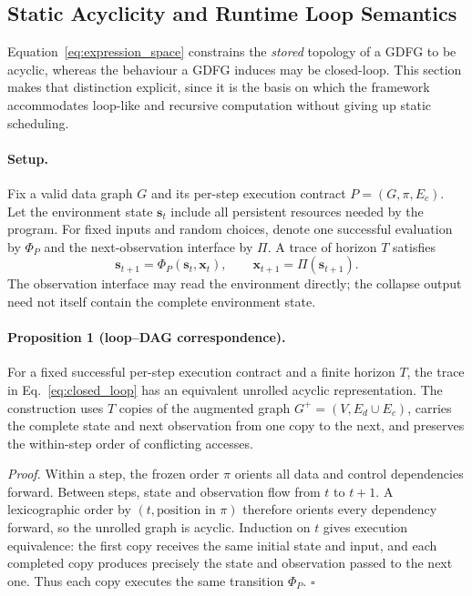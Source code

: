 \subsection{Static Acyclicity and Runtime Loop Semantics}
\label{app:runtime_loops}

Equation~\ref{eq:expression_space} constrains the \emph{stored} topology of a GDFG to be acyclic, whereas the behaviour a GDFG induces may be closed-loop. This section makes that distinction explicit, since it is the basis on which the framework accommodates loop-like and recursive computation without giving up static scheduling.

\paragraph{Setup.}
Fix a valid data graph $G$ and its per-step execution contract $P=(G,\pi,E_c)$. Let the environment state $\mathbf{s}_t$ include all persistent resources needed by the program. For fixed inputs and random choices, denote one successful evaluation by $\Phi_P$ and the next-observation interface by $\Pi$. A trace of horizon $T$ satisfies
\begin{equation}
\label{eq:closed_loop}
\mathbf{s}_{t+1}=\Phi_P(\mathbf{s}_t,\mathbf{x}_t),\qquad
\mathbf{x}_{t+1}=\Pi(\mathbf{s}_{t+1}).
\end{equation}
The observation interface may read the environment directly; the collapse output need not itself contain the complete environment state.

\paragraph{Proposition 1 (loop--DAG correspondence).}
For a fixed successful per-step execution contract and a finite horizon $T$, the trace in Eq.~\ref{eq:closed_loop} has an equivalent unrolled acyclic representation. The construction uses $T$ copies of the augmented graph $G^+=(V,E_d\cup E_c)$, carries the complete state and next observation from one copy to the next, and preserves the within-step order of conflicting accesses.

\emph{Proof.}
Within a step, the frozen order $\pi$ orients all data and control dependencies forward. Between steps, state and observation flow from $t$ to $t+1$. A lexicographic order by $(t,\text{position in }\pi)$ therefore orients every dependency forward, so the unrolled graph is acyclic. Induction on $t$ gives execution equivalence: the first copy receives the same initial state and input, and each completed copy produces precisely the state and observation passed to the next one. Thus each copy executes the same transition $\Phi_P$. \hfill$\square$

